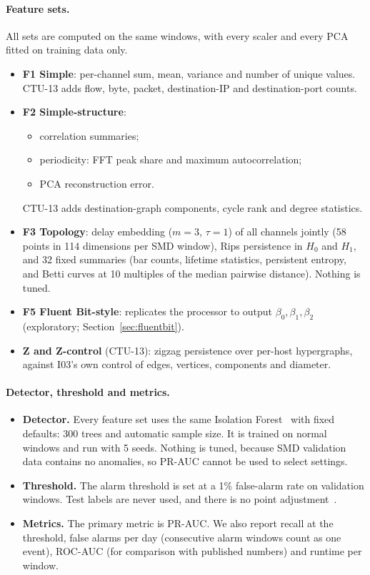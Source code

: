 \paragraph{Feature sets.} All sets are computed on the same windows, with every scaler and every PCA fitted on training data only.
\begin{itemize}
  \item \textbf{F1 Simple}: per-channel sum, mean, variance and number of unique values. CTU-13 adds flow, byte, packet, destination-IP and destination-port counts.
  \item \textbf{F2 Simple-structure}:
    \begin{itemize}
      \item correlation summaries;
      \item periodicity: FFT peak share and maximum autocorrelation;
      \item PCA reconstruction error.
    \end{itemize}
    CTU-13 adds destination-graph components, cycle rank and degree statistics.
  \item \textbf{F3 Topology}: delay embedding ($m=3$, $\tau=1$) of all channels jointly (58 points in 114 dimensions per SMD window), Rips persistence in $H_0$ and $H_1$, and 32 fixed summaries (bar counts, lifetime statistics, persistent entropy, and Betti curves at 10 multiples of the median pairwise distance). Nothing is tuned.
  \item \textbf{F5 Fluent Bit-style}: replicates the  processor to output $\beta_0,\beta_1,\beta_2$ (exploratory; Section~\ref{sec:fluentbit}).
  \item \textbf{Z and Z-control} (CTU-13): zigzag persistence over per-host hypergraphs, against I03's own control of edges, vertices, components and diameter.
\end{itemize}

\paragraph{Detector, threshold and metrics.}
\begin{itemize}
  \item \textbf{Detector.} Every feature set uses the same Isolation Forest~\cite{liu2008iforest} with fixed defaults: 300 trees and automatic sample size. It is trained on normal windows and run with 5 seeds. Nothing is tuned, because SMD validation data contains no anomalies, so PR-AUC cannot be used to select settings.
  \item \textbf{Threshold.} The alarm threshold is set at a 1\% false-alarm rate on validation windows. Test labels are never used, and there is no point adjustment~\cite{kim2022rigorous}.
  \item \textbf{Metrics.} The primary metric is PR-AUC. We also report recall at the threshold, false alarms per day (consecutive alarm windows count as one event), ROC-AUC (for comparison with published numbers) and runtime per window.
\end{itemize}

